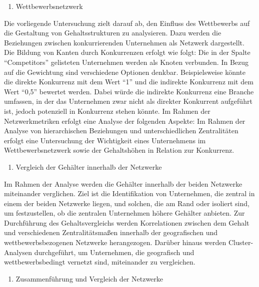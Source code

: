 \documentclass[
]{article}
\providecommand{\tightlist}{%
  \setlength{\itemsep}{0pt}\setlength{\parskip}{0pt}}
\begin{document}
\begin{enumerate}
\def\labelenumi{\arabic{enumi}.}
\setcounter{enumi}{1}
\tightlist
\item
  Wettbewerbsnetzwerk
\end{enumerate}

Die vorliegende Untersuchung zielt darauf ab, den Einfluss des
Wettbewerbs auf die Gestaltung von Gehaltsstrukturen zu analysieren.
Dazu werden die Beziehungen zwischen konkurrierenden Unternehmen als
Netzwerk dargestellt. Die Bildung von Kanten durch Konkurrenzen erfolgt
wie folgt: Die in der Spalte ``Competitors'' gelisteten Unternehmen
werden als Knoten verbunden. In Bezug auf die Gewichtung sind
verschiedene Optionen denkbar. Beispielsweise könnte die direkte
Konkurrenz mit dem Wert ``1'' und die indirekte Konkurrenz mit dem Wert
``0,5'' bewertet werden. Dabei würde die indirekte Konkurrenz eine
Branche umfassen, in der das Unternehmen zwar nicht als direkter
Konkurrent aufgeführt ist, jedoch potenziell in Konkurrenz stehen
könnte. Im Rahmen der Netzwerkmetriken erfolgt eine Analyse der
folgenden Aspekte: Im Rahmen der Analyse von hierarchischen Beziehungen
und unterschiedlichen Zentralitäten erfolgt eine Untersuchung der
Wichtigkeit eines Unternehmens im Wettbewerbsnetzwerk sowie der
Gehaltshöhen in Relation zur Konkurrenz.

\begin{enumerate}
\def\labelenumi{\arabic{enumi}.}
\setcounter{enumi}{2}
\tightlist
\item
  Vergleich der Gehälter innerhalb der Netzwerke
\end{enumerate}

Im Rahmen der Analyse werden die Gehälter innerhalb der beiden Netzwerke
miteinander verglichen. Ziel ist die Identifikation von Unternehmen, die
zentral in einem der beiden Netzwerke liegen, und solchen, die am Rand
oder isoliert sind, um festzustellen, ob die zentralen Unternehmen
höhere Gehälter anbieten. Zur Durchführung des Gehaltsvergleichs werden
Korrelationen zwischen dem Gehalt und verschiedenen Zentralitätsmaßen
innerhalb der geografischen und wettbewerbsbezogenen Netzwerke
herangezogen. Darüber hinaus werden Cluster-Analysen durchgeführt, um
Unternehmen, die geografisch und wettbewerbsbedingt vernetzt sind,
miteinander zu vergleichen.

\begin{enumerate}
\def\labelenumi{\arabic{enumi}.}
\setcounter{enumi}{3}
\tightlist
\item
  Zusammenführung und Vergleich der Netzwerke
\end{enumerate}
\end{document}
